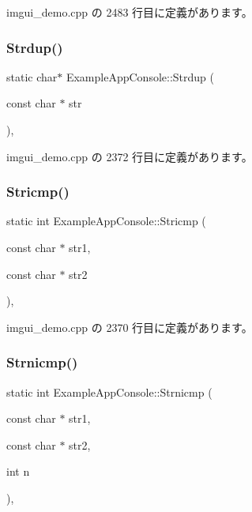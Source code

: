  imgui\+\_\+demo.\+cpp の 2483 行目に定義があります。

\mbox{\label{struct_example_app_console_a61d0da41ef31ea8690b23681a1e54dba}} 
\subsubsection{\texorpdfstring{Strdup()}{Strdup()}}
{\footnotesize\ttfamily static char$\ast$ Example\+App\+Console\+::\+Strdup (\begin{DoxyParamCaption}\item[{const char $\ast$}]{str }\end{DoxyParamCaption})\hspace{0.3cm}{\ttfamily [inline]}, {\ttfamily [static]}}



 imgui\+\_\+demo.\+cpp の 2372 行目に定義があります。

\mbox{\label{struct_example_app_console_a6e5e5d66e77618eff0f89785261c9391}} 
\subsubsection{\texorpdfstring{Stricmp()}{Stricmp()}}
{\footnotesize\ttfamily static int Example\+App\+Console\+::\+Stricmp (\begin{DoxyParamCaption}\item[{const char $\ast$}]{str1,  }\item[{const char $\ast$}]{str2 }\end{DoxyParamCaption})\hspace{0.3cm}{\ttfamily [inline]}, {\ttfamily [static]}}



 imgui\+\_\+demo.\+cpp の 2370 行目に定義があります。

\mbox{\label{struct_example_app_console_a11bcb7a4b801e5eeb0c098c082fedc25}} 
\subsubsection{\texorpdfstring{Strnicmp()}{Strnicmp()}}
{\footnotesize\ttfamily static int Example\+App\+Console\+::\+Strnicmp (\begin{DoxyParamCaption}\item[{const char $\ast$}]{str1,  }\item[{const char $\ast$}]{str2,  }\item[{int}]{n }\end{DoxyParamCaption})\hspace{0.3cm}{\ttfamily [inline]}, {\ttfamily [static]}}




